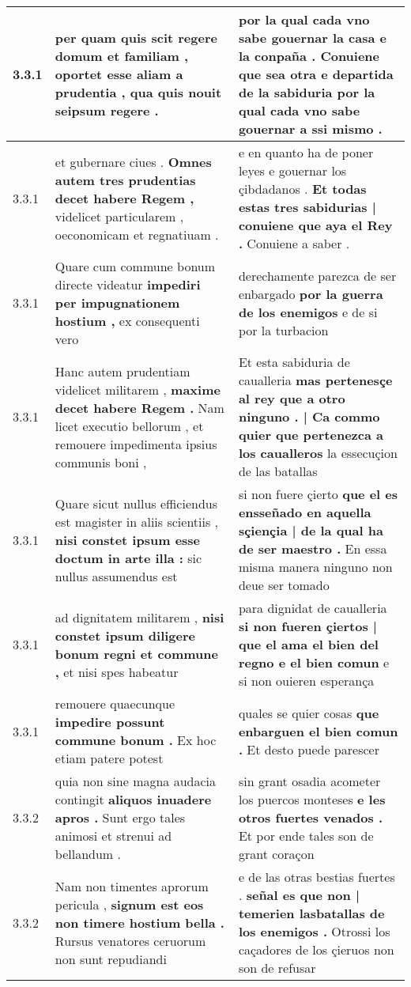 \begin{tabular}{|p{1cm}|p{6.5cm}|p{6.5cm}|}
3.3.1 & per quam quis scit regere domum et familiam , \textbf{ oportet esse aliam a prudentia , } qua quis nouit seipsum regere . & por la qual cada vno sabe gouernar la casa e la conpaña . \textbf{ Conuiene que sea otra e departida de la sabiduria } por la qual cada vno sabe gouernar a ssi mismo . \\\hline
3.3.1 & et gubernare ciues . \textbf{ Omnes autem tres prudentias decet habere Regem , } videlicet particularem , oeconomicam et regnatiuam . & e en quanto ha de poner leyes e gouernar los çibdadanos . \textbf{ Et todas estas tres sabidurias | conuiene que aya el Rey . } Conuiene a saber . \\\hline
3.3.1 & Quare cum commune bonum directe videatur \textbf{ impediri per impugnationem hostium , } ex consequenti vero & derechamente parezca de ser enbargado \textbf{ por la guerra de los enemigos } e de si por la turbacion \\\hline
3.3.1 & Hanc autem prudentiam videlicet militarem , \textbf{ maxime decet habere Regem . } Nam licet executio bellorum , et remouere impedimenta ipsius communis boni , & Et esta sabiduria de caualleria \textbf{ mas pertenesçe al rey que a otro ninguno . | Ca commo quier que pertenezca a los caualleros } la essecuçion de las batallas \\\hline
3.3.1 & Quare sicut nullus efficiendus est magister in aliis scientiis , \textbf{ nisi constet ipsum esse doctum in arte illa : } sic nullus assumendus est & si non fuere çierto \textbf{ que el es ensseñado en aquella sçiençia | de la qual ha de ser maestro . } En essa misma manera ninguno non deue ser tomado \\\hline
3.3.1 & ad dignitatem militarem , \textbf{ nisi constet ipsum diligere bonum regni et commune , } et nisi spes habeatur & para dignidat de caualleria \textbf{ si non fueren çiertos | que el ama el bien del regno e el bien comun } e si non ouieren esperança \\\hline
3.3.1 & remouere quaecunque \textbf{ impedire possunt commune bonum . } Ex hoc etiam patere potest & quales se quier cosas \textbf{ que enbarguen el bien comun . } Et desto puede parescer \\\hline
3.3.2 & quia non sine magna audacia contingit \textbf{ aliquos inuadere apros . } Sunt ergo tales animosi et strenui ad bellandum . & sin grant osadia acometer los puercos monteses \textbf{ e les otros fuertes venados . } Et por ende tales son de grant coraçon \\\hline
3.3.2 & Nam non timentes aprorum pericula , \textbf{ signum est eos non timere hostium bella . } Rursus venatores ceruorum non sunt repudiandi & e de las otras bestias fuertes . \textbf{ señal es que non | temerien lasbatallas de los enemigos . } Otrossi los caçadores de los çieruos non son de refusar \\\hline

\end{tabular}

